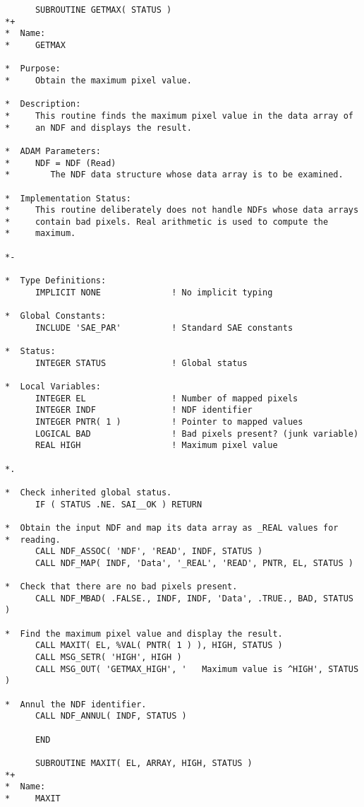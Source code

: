 \small
\begin{verbatim}
      SUBROUTINE GETMAX( STATUS )
*+
*  Name:
*     GETMAX

*  Purpose:
*     Obtain the maximum pixel value.

*  Description:
*     This routine finds the maximum pixel value in the data array of
*     an NDF and displays the result.

*  ADAM Parameters:
*     NDF = NDF (Read)
*        The NDF data structure whose data array is to be examined.

*  Implementation Status:
*     This routine deliberately does not handle NDFs whose data arrays
*     contain bad pixels. Real arithmetic is used to compute the
*     maximum.

*-
      
*  Type Definitions:
      IMPLICIT NONE              ! No implicit typing

*  Global Constants:
      INCLUDE 'SAE_PAR'          ! Standard SAE constants

*  Status:
      INTEGER STATUS             ! Global status

*  Local Variables:
      INTEGER EL                 ! Number of mapped pixels
      INTEGER INDF               ! NDF identifier
      INTEGER PNTR( 1 )          ! Pointer to mapped values
      LOGICAL BAD                ! Bad pixels present? (junk variable)
      REAL HIGH                  ! Maximum pixel value

*.

*  Check inherited global status.
      IF ( STATUS .NE. SAI__OK ) RETURN

*  Obtain the input NDF and map its data array as _REAL values for
*  reading.
      CALL NDF_ASSOC( 'NDF', 'READ', INDF, STATUS )
      CALL NDF_MAP( INDF, 'Data', '_REAL', 'READ', PNTR, EL, STATUS )

*  Check that there are no bad pixels present.
      CALL NDF_MBAD( .FALSE., INDF, INDF, 'Data', .TRUE., BAD, STATUS )

*  Find the maximum pixel value and display the result.
      CALL MAXIT( EL, %VAL( PNTR( 1 ) ), HIGH, STATUS )
      CALL MSG_SETR( 'HIGH', HIGH )
      CALL MSG_OUT( 'GETMAX_HIGH', '   Maximum value is ^HIGH', STATUS )

*  Annul the NDF identifier.
      CALL NDF_ANNUL( INDF, STATUS )

      END

      SUBROUTINE MAXIT( EL, ARRAY, HIGH, STATUS )
*+
*  Name:
*     MAXIT


\end{verbatim}
